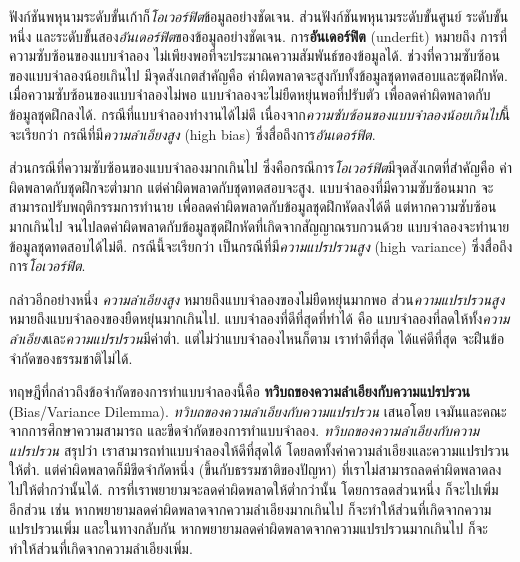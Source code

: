 ฟังก์ชันพหุนามระดับขั้นเก้าก็\textit{โอเวอร์ฟิต}ข้อมูลอย่างชัดเจน.
ส่วนฟังก์ชันพหุนามระดับขั้นศูนย์ ระดับขั้นหนึ่ง และระดับขั้นสอง\textit{อันเดอร์ฟิต}ของข้อมูลอย่างชัดเจน.
การ\textbf{อันเดอร์ฟิต} (underfit)
หมายถึง
การที่ความซับซ้อนของแบบจำลอง
ไม่เพียงพอที่จะประมาณความสัมพันธ์ของข้อมูลได้.
%
ช่วงที่ความซับซ้อนของแบบจำลองน้อยเกินไป %
มีจุดสังเกตสำคัญคือ ค่าผิดพลาดจะสูงกับทั้งข้อมูลชุดทดสอบและชุดฝึกหัด.
เมื่อความซับซ้อนของแบบจำลองไม่พอ
แบบจำลองจะไม่ยืดหยุ่นพอที่ปรับตัว
เพื่อลดค่าผิดพลาดกับข้อมูลชุดฝึกลงได้.
กรณีที่แบบจำลองทำงานได้ไม่ดี
เนื่องจาก\textit{ความซับซ้อนของแบบจำลองน้อยเกินไป}นี้ จะเรียกว่า กรณีที่มี\textit{ความลำเอียงสูง} (high bias) 
ซึ่งสื่อถึงการ\textit{อันเดอร์ฟิต}.

ส่วนกรณีที่ความซับซ้อนของแบบจำลองมากเกินไป
ซึ่งคือกรณีการ\textit{โอเวอร์ฟิต}มีจุดสังเกตที่สำคัญคือ ค่าผิดพลาดกับชุดฝึกจะต่ำมาก แต่ค่าผิดพลาดกับชุดทดสอบจะสูง.
แบบจำลองที่มีความซับซ้อนมาก
จะสามารถปรับพฤติกรรมการทำนาย
เพื่อลดค่าผิดพลาดกับข้อมูลชุดฝึกหัดลงได้ดี
แต่หากความซับซ้อนมากเกินไป จนไปลดค่าผิดพลาดกับข้อมูลชุดฝึกหัดที่เกิดจากสัญญาณรบกวนด้วย แบบจำลองจะทำนายข้อมูลชุดทดสอบได้ไม่ดี.
กรณีนี้จะเรียกว่า เป็นกรณีที่มี\textit{ความแปรปรวนสูง} (high variance) 
ซึ่งสื่อถึงการ\textit{โอเวอร์ฟิต}.

กล่าวอีกอย่างหนึ่ง \textit{ความลำเอียงสูง}
หมายถึงแบบจำลองของไม่ยืดหยุ่นมากพอ 
ส่วน\textit{ความแปรปรวนสูง}หมายถึงแบบจำลองของยืดหยุ่นมากเกินไป.
%
แบบจำลองที่ดีที่สุดที่ทำได้ คือ แบบจำลองที่ลดให้ทั้ง\textit{ความลำเอียง}และ\textit{ความแปรปรวน}มีค่าต่ำ.
แต่ไม่ว่าแบบจำลองไหนก็ตาม เราทำดีที่สุด ได้แค่ดีที่สุด จะฝืนข้อจำกัดของธรรมชาติไม่ได้.

ทฤษฎีที่กล่าวถึงข้อจำกัดของการทำแบบจำลองนี้คือ \textbf{ทวิบถของความลำเอียงกับความแปรปรวน} (ฺBias/Variance Dilemma).
\textit{ทวิบถของความลำเอียงกับความแปรปรวน} 
เสนอโดย
เจมันและคณะ\cite{GemanEtAl1992a} จากการศึกษาความสามารถ
และขีดจำกัดของการทำแบบจำลอง.
\textit{ทวิบถของความลำเอียงกับความแปรปรวน}
สรุปว่า เราสามารถทำแบบจำลองให้ดีที่สุดได้
โดยลดทั้งค่าความลำเอียงและความแปรปรวนให้ต่ำ.
แต่ค่าผิดพลาดก็มีขีดจำกัดหนึ่ง (ขึ้นกับธรรมชาติของปัญหา) ที่เราไม่สามารถลดค่าผิดพลาดลงไปให้ต่ำกว่านั้นได้. การที่เราพยายามจะลดค่าผิดพลาดให้ต่ำกว่านั้น
โดยการลดส่วนหนึ่ง ก็จะไปเพิ่มอีกส่วน 
เช่น หากพยายามลดค่าผิดพลาดจากความลำเอียงมากเกินไป ก็จะทำให้ส่วนที่เกิดจากความแปรปรวนเพิ่ม 
และในทางกลับกัน
หากพยายามลดค่าผิดพลาดจากความแปรปรวนมากเกินไป ก็จะทำให้ส่วนที่เกิดจากความลำเอียงเพิ่ม. 

